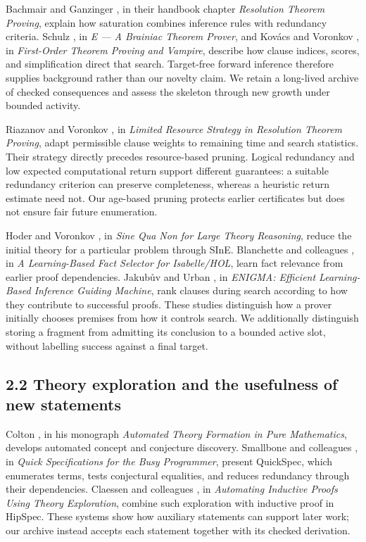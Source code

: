 \documentclass[pdflatex,sn-basic,Numbered]{sn-jnl}
\begin{document}
Bachmair and Ganzinger \citep{BachmairGanzinger2001}, in their handbook chapter \emph{Resolution Theorem Proving}, explain how saturation combines inference rules with redundancy criteria. Schulz \citep{Schulz2002}, in \emph{E --- A Brainiac Theorem Prover}, and Kov\'{a}cs and Voronkov \citep{KovacsVoronkov2013}, in \emph{First-Order Theorem Proving and Vampire}, describe how clause indices, scores, and simplification direct that search. Target-free forward inference therefore supplies background rather than our novelty claim. We retain a long-lived archive of checked consequences and assess the skeleton through new growth under bounded activity.

Riazanov and Voronkov \citep{RiazanovVoronkov2003LRS}, in \emph{Limited Resource Strategy in Resolution Theorem Proving}, adapt permissible clause weights to remaining time and search statistics. Their strategy directly precedes resource-based pruning. Logical redundancy and low expected computational return support different guarantees: a suitable redundancy criterion can preserve completeness, whereas a heuristic return estimate need not. Our age-based pruning protects earlier certificates but does not ensure fair future enumeration.

Hoder and Voronkov \citep{HoderVoronkov2011}, in \emph{Sine Qua Non for Large Theory Reasoning}, reduce the initial theory for a particular problem through SInE. Blanchette and colleagues \citep{BlanchetteEtAl2016}, in \emph{A Learning-Based Fact Selector for Isabelle/HOL}, learn fact relevance from earlier proof dependencies. Jakub\r{u}v and Urban \citep{JakubuvUrban2017}, in \emph{ENIGMA: Efficient Learning-Based Inference Guiding Machine}, rank clauses during search according to how they contribute to successful proofs. These studies distinguish how a prover initially chooses premises from how it controls search. We additionally distinguish storing a fragment from admitting its conclusion to a bounded active slot, without labelling success against a final target.

\subsection*{2.2 Theory exploration and the usefulness of new statements}\label{theory-exploration-and-the-usefulness-of-new-statements}

Colton \citep{Colton2002}, in his monograph \emph{Automated Theory Formation in Pure Mathematics}, develops automated concept and conjecture discovery. Smallbone and colleagues \citep{SmallboneEtAl2017}, in \emph{Quick Specifications for the Busy Programmer}, present QuickSpec, which enumerates terms, tests conjectural equalities, and reduces redundancy through their dependencies. Claessen and colleagues \citep{ClaessenEtAl2013}, in \emph{Automating Inductive Proofs Using Theory Exploration}, combine such exploration with inductive proof in HipSpec. These systems show how auxiliary statements can support later work; our archive instead accepts each statement together with its checked derivation.
\end{document}
